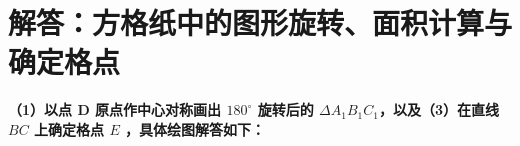 

\newpage

\newpage

\section{解答：方格纸中的图形旋转、面积计算与确定格点}

\vspace{0.6cm}

\textbf{（1）以点 D 原点作中心对称画出 $180^\circ$ 旋转后的 $\Delta A_1B_1C_1$，以及（3）在直线 $BC$ 上确定格点 $E$ ，具体绘图解答如下：}

\vspace{0.4cm}

